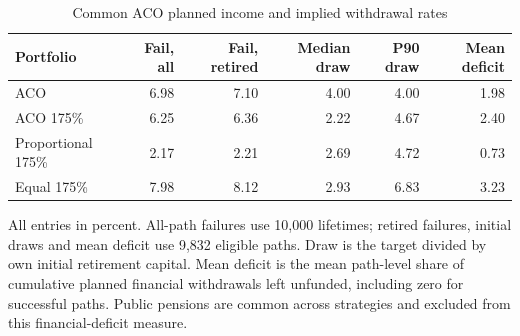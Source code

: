 \begin{table}[htbp]\centering\small
\caption{Common ACO planned income and implied withdrawal rates}\label{tab:review-common}
\begin{tabular}{lrrrrr}\toprule
Portfolio & Fail, all & Fail, retired & Median draw & P90 draw & Mean deficit \\
\midrule
ACO & 6.98 & 7.10 & 4.00 & 4.00 & 1.98 \\
ACO 175\% & 6.25 & 6.36 & 2.22 & 4.67 & 2.40 \\
Proportional 175\% & 2.17 & 2.21 & 2.69 & 4.72 & 0.73 \\
Equal 175\% & 7.98 & 8.12 & 2.93 & 6.83 & 3.23 \\
\bottomrule\end{tabular}
\par\smallskip\begin{minipage}{0.96\textwidth}\footnotesize
All entries in percent. All-path failures use 10,000 lifetimes; retired failures, initial draws and mean deficit use 9,832 eligible paths. Draw is the target divided by own initial retirement capital. Mean deficit is the mean path-level share of cumulative planned financial withdrawals left unfunded, including zero for successful paths. Public pensions are common across strategies and excluded from this financial-deficit measure.
\end{minipage}\end{table}
